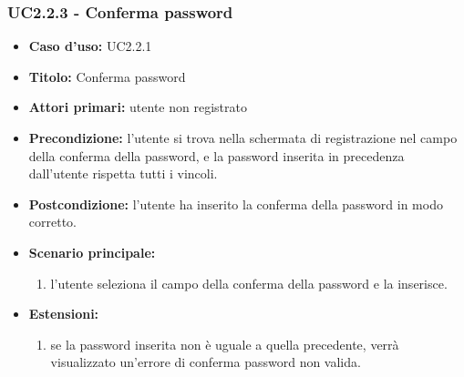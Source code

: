 \documentclass[casi-duso]{subfiles}
\begin{document}
\subsubsection{UC2.2.3 - Conferma password}
\label{subsub:uc2.2.3utente}
\begin{itemize}
  \item \textbf{Caso d’uso:} UC2.2.1 
  \item \textbf{Titolo:} Conferma password
  \item \textbf{Attori primari:} utente non registrato
  \item \textbf{Precondizione:} l'utente si trova nella schermata di registrazione nel campo della conferma della password, 
  e la password inserita in precedenza dall'utente rispetta tutti i vincoli.
  \item \textbf{Postcondizione:} l'utente ha inserito la conferma della password in modo corretto. 
  \item \textbf{Scenario principale:} 
  \begin{enumerate}
    \item l'utente seleziona il campo della conferma della password e la inserisce.
  \end{enumerate}
  \item \textbf{Estensioni:} 
  \begin{enumerate}
    \item se la password inserita non è uguale a quella precedente, verrà visualizzato un'errore di conferma password non valida.
  \end{enumerate}     
\end{itemize}

\end{document}
